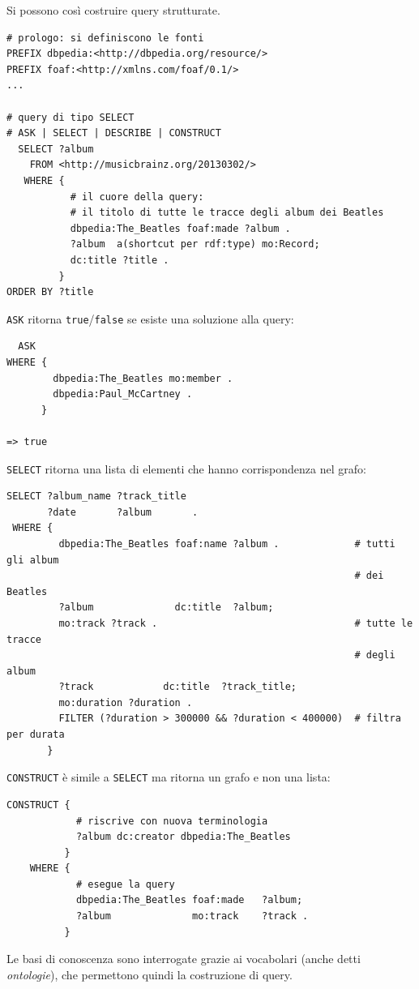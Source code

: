 \documentclass[11pt]{article}
\begin{document}
Si possono così costruire query strutturate.
\begin{verbatim}
# prologo: si definiscono le fonti
PREFIX dbpedia:<http://dbpedia.org/resource/>
PREFIX foaf:<http://xmlns.com/foaf/0.1/>
...

# query di tipo SELECT
# ASK | SELECT | DESCRIBE | CONSTRUCT
  SELECT ?album
    FROM <http://musicbrainz.org/20130302/>
   WHERE {
           # il cuore della query:
           # il titolo di tutte le tracce degli album dei Beatles
           dbpedia:The_Beatles foaf:made ?album .
           ?album  a(shortcut per rdf:type) mo:Record;
           dc:title ?title .
         }
ORDER BY ?title
\end{verbatim}

\verb|ASK| ritorna \verb|true|/\verb|false| se esiste una soluzione alla query:
\begin{verbatim}
  ASK
WHERE {
        dbpedia:The_Beatles mo:member .
        dbpedia:Paul_McCartney .
      }

=> true
\end{verbatim}

\verb|SELECT| ritorna una lista di elementi che hanno corrispondenza nel grafo:
\begin{verbatim}
SELECT ?album_name ?track_title
       ?date       ?album       .
 WHERE {
         dbpedia:The_Beatles foaf:name ?album .             # tutti gli album
                                                            # dei Beatles
         ?album              dc:title  ?album;
         mo:track ?track .                                  # tutte le tracce
                                                            # degli album
         ?track            dc:title  ?track_title;
         mo:duration ?duration .
         FILTER (?duration > 300000 && ?duration < 400000)  # filtra per durata
       }
\end{verbatim}

\verb|CONSTRUCT| è simile a \verb|SELECT| ma ritorna un grafo e non una lista:
\begin{verbatim}
CONSTRUCT {
            # riscrive con nuova terminologia
            ?album dc:creator dbpedia:The_Beatles
          }
    WHERE {
            # esegue la query
            dbpedia:The_Beatles foaf:made   ?album;
            ?album              mo:track    ?track .
          }
\end{verbatim}
  
Le basi di conoscenza sono interrogate grazie ai vocabolari (anche detti \textit{ontologie}), che permettono quindi la costruzione di query.
\end{document}
